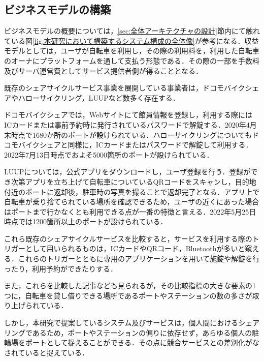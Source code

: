   \subsection{ビジネスモデルの構築}
    \label{sec:ビジネスモデルの構築}
      \par ビジネスモデルの概要については，\ref{sec:全体アーキテクチャの設計}節内にて触れている図\ref{fig:本研究において構築するシステム構成の全体像}が参考になる．収益モデルとしては，ユーザが自転車を利用し，その際の利用料を，利用した自転車のオーナにプラットフォームを通して支払う形態である．その際の一部を手数料及びサーバ運営費としてサービス提供者側が得ることとなる．
      \par 既存のシェアサイクルサービス事業を展開している事業者は，ドコモバイクシェアやハローサイクリング，LUUPなど数多く存在する．
      \par ドコモバイクシェアでは，Webサイトにて館員情報を登録し，利用する際にはICカードまたは事前予約時に発行されているパスワードで解錠する．2020年4月末時点で1680か所のポートが設けられている．ハローサイクリングについてもドコモバイクシェアと同様に，ICカードまたはパスワードで解錠して利用する．2022年7月13日時点でおよそ5000箇所のポートが設けられている．
      \par LUUPについては，公式アプリをダウンロードし，ユーザ登録を行う．登録ができ次第アプリを立ち上げて自転車についているQRコードをスキャンし，目的地付近のポートに返却後，駐車時の写真を撮ることで返却完了となる．アプリ上で自転車が乗り捨てられている場所を確認できるため，ユーザの近くにあった場合はポートまで行かなくとも利用できる点が一番の特徴と言える．2022年5月25日時点では1200箇所以上のポートが設けられている．
      \par これら既存のシェアサイクルサービスを比較すると，サービスを利用する際のトリガーとして用いられるものは，ICカードやQRコード，Bluetoothが多いと窺える．これらのトリガーとともに専用のアプリケーションを用いて施錠や解錠を行ったり，利用予約ができたりする．
      \par また，これらを比較した記事なども見られるが，その比較指標の大きな要素の1つに，自転車を貸し借りできる場所であるポートやステーションの数の多さが取り上げられている．
      \par しかし，本研究で提案しているシステム及びサービスは，個人間におけるシェアリングであるため，ポートやステーションの偏りに依存せず，あらゆる個人の駐輪場をポートとして捉えることができる．その点に競合サービスとの差別化がなされていると捉えている．
